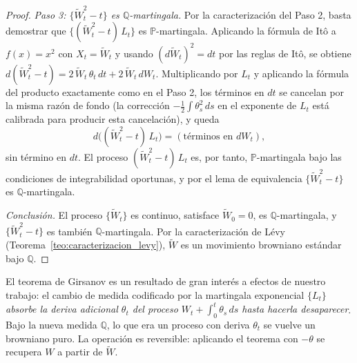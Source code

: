 \documentclass[11pt,a4paper,oneside]{report}
\theoremstyle{plain}
\theoremstyle{definition}
\theoremstyle{remark}
\newcommand{\PP}{\mathbb{P}}
\newcommand{\Q}{\mathbb{Q}}
\newcommand{\1}{\mathbf{1}}
\begin{document}
\begin{proof}
\emph{Paso 3: $\{\widetilde{W}_t^2 - t\}$ es $\Q$-martingala.} Por la
caracterización del Paso 2, basta demostrar que $\{(\widetilde{W}_t^2
- t)\, L_t\}$ es $\PP$-martingala. Aplicando la fórmula de Itô a
$f(x) = x^2$ con $X_t = \widetilde{W}_t$ y usando $(d\widetilde{W}_t)^2
= dt$ por las reglas de Itô, se obtiene $d(\widetilde{W}_t^2 - t) = 2\,
\widetilde{W}_t\, \theta_t\, dt + 2\, \widetilde{W}_t\, dW_t$.
Multiplicando por $L_t$ y aplicando la fórmula del producto exactamente
como en el Paso 2, los términos en $dt$ se cancelan por la misma
razón de fondo (la corrección $-\tfrac{1}{2} \int \theta_s^2\, ds$
en el exponente de $L_t$ está calibrada para producir esta cancelación),
y queda
\begin{equation*}
  d\bigl((\widetilde{W}_t^2 - t)\, L_t\bigr)
  = (\text{términos en } dW_t),
\end{equation*}
sin término en $dt$. El proceso $(\widetilde{W}_t^2 - t)\, L_t$ es,
por tanto, $\PP$-martingala bajo las condiciones de integrabilidad
oportunas, y por el lema de equivalencia $\{\widetilde{W}_t^2 - t\}$
es $\Q$-martingala.

\emph{Conclusión.} El proceso $\{\widetilde{W}_t\}$ es continuo,
satisface $\widetilde{W}_0 = 0$, es $\Q$-martingala, y $\{\widetilde{W}_t^2
- t\}$ es también $\Q$-martingala. Por la caracterización de Lévy
(Teorema~\ref{teo:caracterizacion_levy}), $\widetilde{W}$ es un
movimiento browniano estándar bajo $\Q$.
\end{proof}

El teorema de Girsanov es un resultado de gran interés a efectos de nuestro trabajo: el cambio de medida codificado
por la martingala exponencial $\{L_t\}$ \emph{absorbe la deriva
adicional $\theta_t$ del proceso $W_t + \int_0^t \theta_s\, ds$ hasta
hacerla desaparecer}. Bajo la nueva medida $\Q$, lo que era un proceso
con deriva $\theta_t$ se vuelve un browniano puro. La operación es
reversible: aplicando el teorema con $-\theta$ se recupera $W$ a partir
de $\widetilde{W}$.
\end{document}
